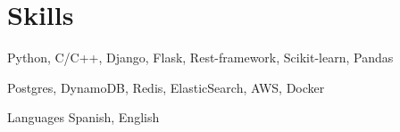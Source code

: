 
\section{Skills}

    {Python, C/C++, Django, Flask, Rest-framework, Scikit-learn, Pandas}

    {Postgres, DynamoDB, Redis, ElasticSearch, AWS, Docker}

  \cvitem
    {Languages} %
    {Spanish, English} %

